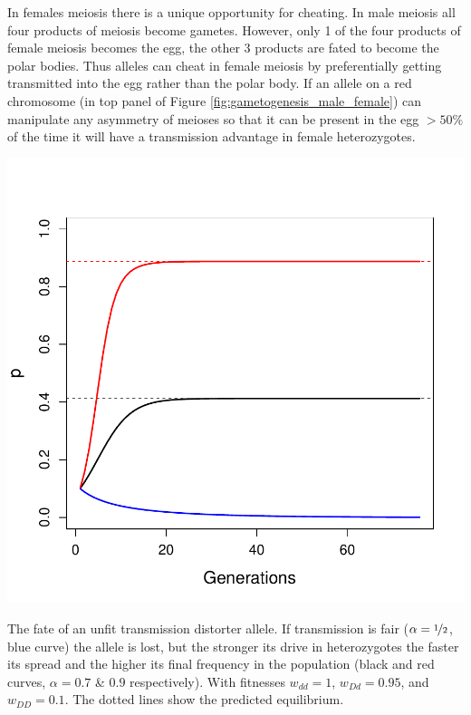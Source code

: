 {In females meiosis there is a unique opportunity for cheating. In male
meiosis all four products of meiosis become gametes. 
However, only 1 of the four products of female meiosis becomes the egg, the other 3 products
are fated to become the polar bodies. Thus alleles can cheat in female meiosis by preferentially getting
transmitted into the egg rather than the polar body. If an allele on
a red chromosome (in top panel of Figure \ref{fig:gametogenesis_male_female}) can manipulate any asymmetry of meioses so that it can be
present in the egg $>50\%$ of the time it will have a transmission
advantage in female heterozygotes. 

 \begin{marginfigure}
\begin{center}
\includegraphics[width= \textwidth]{figures/autosomal_driver.pdf}
\end{center}
\caption{
The fate of an unfit transmission distorter allele. If transmission is
fair ($\alpha =\nicefrac
{1}{2}$, blue curve) the allele is lost, but the stronger its drive in
heterozygotes the faster its spread and the higher its final frequency
in the population (black and red curves, $\alpha =0.7$ \& $0.9$
respectively).  With fitnesses $w_{dd}=1$,
$w_{Dd}=0.95$, and $ w_{DD}=0.1$. The dotted lines show the predicted
equilibrium. 
} \label{fig:autosomal_driver}
\end{marginfigure} 


}
